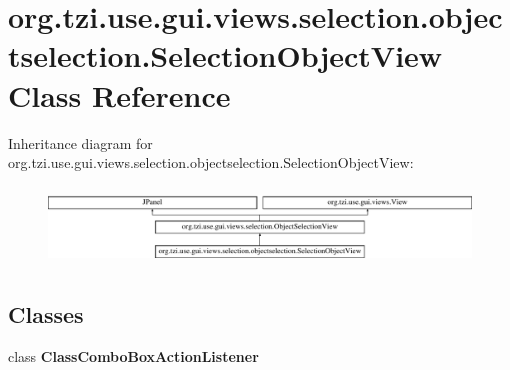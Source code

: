 \hypertarget{classorg_1_1tzi_1_1use_1_1gui_1_1views_1_1selection_1_1objectselection_1_1_selection_object_view}{\section{org.\-tzi.\-use.\-gui.\-views.\-selection.\-objectselection.\-Selection\-Object\-View Class Reference}
\label{classorg_1_1tzi_1_1use_1_1gui_1_1views_1_1selection_1_1objectselection_1_1_selection_object_view}
}
Inheritance diagram for org.\-tzi.\-use.\-gui.\-views.\-selection.\-objectselection.\-Selection\-Object\-View\-:\begin{figure}[H]
\begin{center}
\leavevmode
\includegraphics[height=2.105263cm]{classorg_1_1tzi_1_1use_1_1gui_1_1views_1_1selection_1_1objectselection_1_1_selection_object_view}
\end{center}
\end{figure}
\subsection*{Classes}
\begin{DoxyCompactItemize}
\item 
class {\bfseries Class\-Combo\-Box\-Action\-Listener}
\end{DoxyCompactItemize}
